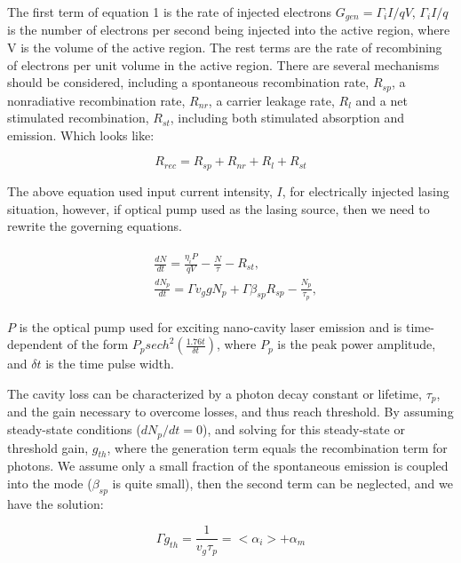 The first term of equation 1 is the rate of injected electrons $G_{gen} =
{\Gamma_{i}I}/{qV}$, ${\Gamma_{i}I}/{q}$ is the number of electrons per
second being injected into the active region, where V is the volume of the
active region. The rest terms are the rate of recombining of electrons per unit
volume in the active region. There are several mechanisms should be considered,
including a spontaneous recombination rate, $R_{sp}$, a nonradiative
recombination rate, $R_{nr}$, a carrier leakage rate, $R_l$ and a net
stimulated recombination, $R_{st}$, including both stimulated absorption and
emission. Which looks like:

\begin{equation}
  R_{rec} = R_{sp} + R_{nr} + R_{l} + R_{st}
\end{equation}

The above equation used input current intensity, $I$, for electrically injected
lasing situation, however, if optical pump used as the lasing source, then we
need to rewrite the governing equations.

\begin{eqnarray}
\begin{aligned}
  & \frac{dN}{dt} = \frac{\eta_{i}P}{qV} - \frac{N}{\tau} - R_{st},
  \\
  & \frac{dN_p}{dt} = {\Gamma}v_g{g}N_p + \Gamma\beta_{sp}R_{sp} - \frac{N_p}{\tau_p},
\end{aligned}
\label{eq:eight}
\end{eqnarray}

$P$ is the optical pump used for exciting nano-cavity laser emission and is
time-dependent of the form $P_{p}sech^2(\frac{1.76t}{\delta{t}})$, where $P_p$ is the peak power amplitude, and $\delta{t}$ is the time pulse width.


The cavity loss can be characterized by a photon decay constant or lifetime,
$\tau_p$, and the gain necessary to overcome losses, and thus reach threshold.
By assuming steady-state conditions (\ie $dN_p/dt = 0$), and solving for this
steady-state or threshold gain, $g_{th}$, where the generation term equals the
recombination term for photons. We assume only a small fraction of the
spontaneous emission is coupled into the mode (\ie $\beta_{sp}$ is quite
small), then the second term can be neglected, and we have the solution:

\begin{equation}
  \Gamma{g_{th}} = \frac{1}{v_g\tau_p} = <\alpha_i> + \alpha_m
\end{equation}

